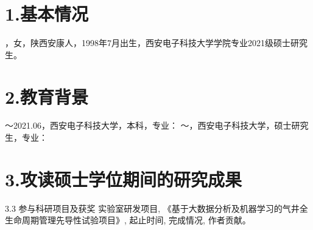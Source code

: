 \begin{resume}
\section*{1.\hspace{0.75em}基本情况}
，女，陕西安康人，1998年7月出生，西安电子科技大学学院专业2021级硕士研究生。
\section*{2.\hspace{0.75em}教育背景}
\begin{resumelist*}
～2021.06，西安电子科技大学，本科，专业：
～\phantom{}，西安电子科技大学，硕士研究生，专业：
\end{resumelist*}
\section*{3.\hspace{0.75em}攻读硕士学位期间的研究成果}
\begin{resumelist}{\hspace{-0.25em}3.3\hspace{0.5em} 参与科研项目及获奖}
\resumelistitem 实验室研发项目, 《基于大数据分析及机器学习的气井全生命周期管理先导性试验项目》, 起止时间, 完成情况, 作者贡献。
\end{resumelist}
\end{resume}
